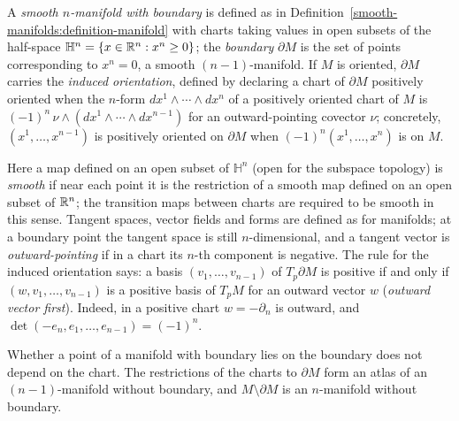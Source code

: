 \begin{definition}\label{differential-forms:definition-manifold-with-boundary}
A \emph{smooth $n$-manifold with boundary} is defined as in Definition~\ref{smooth-manifolds:definition-manifold} with charts taking values in open subsets of the half-space
$\mathbb{H}^n = \{x \in \mathbb{R}^n : x^n \geq 0\}$; the \emph{boundary} $\partial M$ is the set of points corresponding to $x^n = 0$, a smooth $(n-1)$-manifold. If $M$ is oriented, $\partial M$ carries the
\emph{induced orientation}, defined by declaring a chart of $\partial M$ positively oriented when the $n$-form $dx^1 \wedge \cdots \wedge dx^n$ of a positively oriented chart of $M$ is $(-1)^n\,\nu \wedge
(dx^1 \wedge \cdots \wedge dx^{n-1})$ for an outward-pointing covector $\nu$; concretely, $(x^1, \ldots, x^{n-1})$ is positively oriented on $\partial M$ when $(-1)^n(x^1, \ldots, x^n)$ is on $M$.
\end{definition}

Here a map defined on an open subset of $\mathbb{H}^n$ (open for the subspace topology) is \emph{smooth} if near each point it is the restriction of a smooth map defined on an open subset of $\mathbb{R}^n$;
the transition maps between charts are required to be smooth in this sense. Tangent spaces, vector fields and forms are defined as for manifolds; at a boundary point the tangent space is
still $n$-dimensional, and a tangent vector is \emph{outward-pointing} if in a chart its $n$-th component is negative. The rule for the induced orientation says: a basis
$(v_1, \ldots, v_{n-1})$ of $T_p\partial M$ is positive if and only if $(w, v_1, \ldots, v_{n-1})$ is a positive basis of $T_pM$ for an outward vector $w$ (\emph{outward vector first}).
Indeed, in a positive chart $w = -\partial_n$ is outward, and $\det(-e_n, e_1, \ldots, e_{n-1}) = (-1)^n$.

\begin{lemma}\label{differential-forms:lemma-boundary-well-defined}
Whether a point of a manifold with boundary lies on the boundary does not depend on the chart. The restrictions of the charts to $\partial M$ form an atlas of an $(n-1)$-manifold without
boundary, and $M \setminus \partial M$ is an $n$-manifold without boundary.
\end{lemma}

